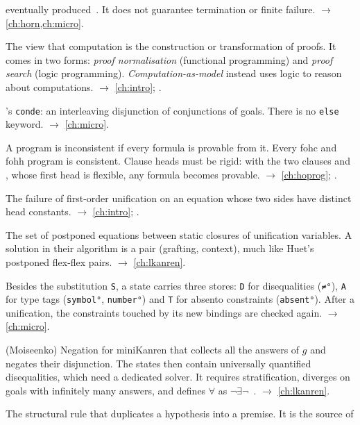 \begin{glossarylist}
  eventually produced~\cite{RozplokhasVyatkinBoulytchev2020}. It does not guarantee termination or finite
  failure. $\rightarrow$ \cref{ch:horn,ch:micro}.
\item[Computation-as-deduction] The view that computation is the construction or transformation of proofs. It
  comes in two forms: \emph{proof normalisation} (functional programming) and \emph{proof search} (logic
  programming). \emph{Computation-as-model} instead uses logic to reason about computations.
  $\rightarrow$ \cref{ch:intro}; .
\item[\texttt{cond°}] \micro{}'s \texttt{conde}: an interleaving disjunction of conjunctions of goals. There is no
  \texttt{else} keyword. $\rightarrow$ \cref{ch:micro}.
\item[Consistent / inconsistent program] A program is inconsistent if every formula is provable from it. Every fohc
  and fohh program is consistent. Clause heads must be rigid: with the two clauses  and ,
  whose first head is flexible, any formula becomes provable. $\rightarrow$ \cref{ch:hoprog}; .
\item[Constant clash] The failure of first-order unification on an equation whose two sides have distinct head
  constants. $\rightarrow$ \cref{ch:intro}; .
\item[Context (Ma--Friedman)] The set of postponed equations between static closures of unification variables. A
  solution in their algorithm is a pair (grafting, context), much like Huet's postponed flex-flex pairs.
  $\rightarrow$ \cref{ch:lkanren}.
\item[Constraint store (\micro{})] Besides the substitution \texttt{S}, a state carries three stores:
  \texttt{D} for disequalities (\texttt{≠°}), \texttt{A} for type tags (\texttt{symbol°}, \texttt{number°}) and
  \texttt{T} for absento constraints (\texttt{absent°}). After a unification, the constraints touched by its new
  bindings are checked again. $\rightarrow$ \cref{ch:micro}.
\item[Constructive negation] (Moiseenko) Negation for miniKanren that collects all the answers of $g$ and negates
  their disjunction. The states then contain universally quantified disequalities, which need a dedicated solver.
  It requires stratification, diverges on goals with infinitely many answers, and defines $\forall$ as
  $\neg\exists\neg$~\cite{Moiseenko2019}. $\rightarrow$ \cref{ch:lkanren}.
\item[Contraction] The structural rule that duplicates a hypothesis into a premise. It is the source of

\end{glossarylist}

